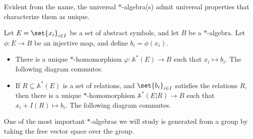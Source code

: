 Evident from the name, the universal $\ast$-algebra(s) admit universal properties that characterize them as unique.
\begin{theorem}\label{thm:universal_property_free_algebra}
  Let $E = \set{x_i}_{i\in I}$ be a set of abstract symbols, and let $B$ be a $\ast$-algebra. Let $\phi\colon E\rightarrow B$ be an injective map, and define $b_i = \phi\left(x_i\right)$.
  \begin{itemize}
    \item There is a unique $\ast$-homomorphism $\varphi\colon \mathbb{A}^{\ast}\left(E\right) \rightarrow B$ such that $x_i \mapsto b_i$. The following diagram commutes.
      \begin{center}
      \end{center}
    \item If $R\subseteq \mathbb{A}^{\ast}\left(E\right)$ is a set of relations, and $\set{b_i}_{i\in I}$ satisfies the relations $R$, then there is a unique $\ast$-homomorphism $\mathbb{A}^{\ast}\left(E|R\right) \rightarrow B$ such that $x_i + I(R) \mapsto b_i$. The following diagram commutes.
      \begin{center}
      \end{center}
  \end{itemize}
\end{theorem}
One of the most important $\ast$-algebras we will study is generated from a group by taking the free vector space over the group.

